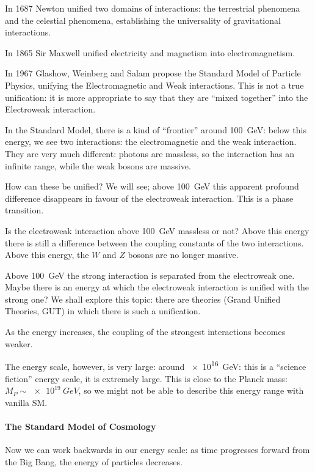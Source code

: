 \documentclass[main.tex]{subfiles}
\begin{document}
In 1687 Newton unified two domains of interactions: the terrestrial phenomena and the celestial phenomena, establishing the universality of gravitational interactions. 

In 1865 Sir Maxwell unified electricity and magnetism into electromagnetism. 

In 1967 Glashow, Weinberg and Salam propose the Standard Model of Particle Physics, unifying the Electromagnetic and Weak interactions. 
This is not a true unification: it is more appropriate to say that they are ``mixed together'' into the Electroweak interaction.  

In the Standard Model, there is a kind of ``frontier'' around \SI{100}{GeV}: below this energy, we see two interactions: the electromagnetic and the weak interaction. 
They are very much different: photons are massless, so the interaction has an infinite range, while the weak bosons are massive. 

How can these be unified? We will see; above \SI{100}{GeV} this apparent profound difference disappears in favour of the electroweak interaction. 
This is a phase transition.

Is the electroweak interaction above \SI{100}{GeV} massless or not?
Above this energy there is still a difference between the coupling constants of the two interactions.
Above this energy, the \(W\) and \(Z\) bosons are no longer massive. 

Above \SI{100}{GeV} the strong interaction is separated from the electroweak one. Maybe there is an energy at which the electroweak interaction is unified with the strong one? 
We shall explore this topic: there are theories (Grand Unified Theories, GUT) in which there is such a unification.

As the energy increases, the coupling of the strongest interactions becomes weaker.

The energy scale, however, is very large: around \SI{e16}{GeV}: this is a ``science fiction'' energy scale, it is extremely large. 
This is close to the Planck mass: \(M_P  \sim \SI{e19}{GeV}\), so we might not be able to describe this energy range with vanilla SM. 

\paragraph{The Standard Model of Cosmology}

Now we can work backwards in our energy scale: as time progresses forward from the Big Bang, the energy of particles decreases. 
\end{document}
